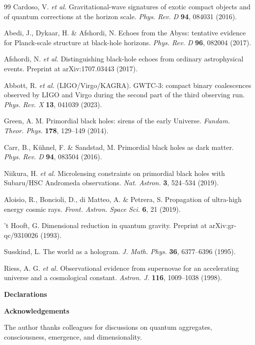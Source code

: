 \documentclass[11pt,a4paper]{article}
\begin{document}
\begin{thebibliography}{99}
Cardoso, V. \textit{et al.} Gravitational-wave signatures of exotic compact objects and of quantum corrections at the horizon scale. \textit{Phys. Rev. D} \textbf{94}, 084031 (2016).

Abedi, J., Dykaar, H. \& Afshordi, N. Echoes from the Abyss: tentative evidence for Planck-scale structure at black-hole horizons. \textit{Phys. Rev. D} \textbf{96}, 082004 (2017).

Afshordi, N. \textit{et al.} Distinguishing black-hole echoes from ordinary astrophysical events. Preprint at arXiv:1707.03443 (2017).

Abbott, R. \textit{et al.} (LIGO/Virgo/KAGRA). GWTC-3: compact binary coalescences observed by LIGO and Virgo during the second part of the third observing run. \textit{Phys. Rev. X} \textbf{13}, 041039 (2023).

Green, A. M. Primordial black holes: sirens of the early Universe. \textit{Fundam. Theor. Phys.} \textbf{178}, 129--149 (2014).

Carr, B., K\"uhnel, F. \& Sandstad, M. Primordial black holes as dark matter. \textit{Phys. Rev. D} \textbf{94}, 083504 (2016).

Niikura, H. \textit{et al.} Microlensing constraints on primordial black holes with Subaru/HSC Andromeda observations. \textit{Nat. Astron.} \textbf{3}, 524--534 (2019).

Aloisio, R., Boncioli, D., di Matteo, A. \& Petrera, S. Propagation of ultra-high energy cosmic rays. \textit{Front. Astron. Space Sci.} \textbf{6}, 21 (2019).

't Hooft, G. Dimensional reduction in quantum gravity. Preprint at arXiv:gr-qc/9310026 (1993).

Susskind, L. The world as a hologram. \textit{J. Math. Phys.} \textbf{36}, 6377--6396 (1995).

Riess, A. G. \textit{et al.} Observational evidence from supernovae for an accelerating universe and a cosmological constant. \textit{Astron. J.} \textbf{116}, 1009--1038 (1998).

\end{thebibliography}
\textbf{\textbf{Declarations}}

  \textbf{\textbf{Acknowledgements}}

The author thanks colleagues for discussions on quantum aggregates, consciousness, emergence, and dimensionality. 
\end{document}
